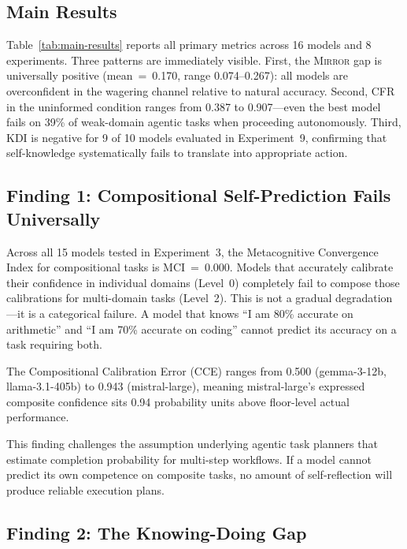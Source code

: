 \documentclass[10pt]{article}
\newcommand{\mirror}{\textsc{Mirror}}
\newcommand{\MCI}{MCI}
\newcommand{\CCE}{CCE}
\newcommand{\KDI}{KDI}
\newcommand{\CFR}{CFR}
\begin{document}
\subsection{Main Results}

Table~\ref{tab:main-results} reports all primary metrics across 16 models and 8
experiments. Three patterns are immediately visible. First, the \mirror{} gap is
universally positive (mean~=~0.170, range 0.074--0.267): all models are
overconfident in the wagering channel relative to natural accuracy. Second, \CFR{}
in the uninformed condition ranges from 0.387 to 0.907---even the best model fails
on 39\% of weak-domain agentic tasks when proceeding autonomously. Third, \KDI{}
is negative for 9 of 10 models evaluated in Experiment~9, confirming that
self-knowledge systematically fails to translate into appropriate action.



\subsection{Finding 1: Compositional Self-Prediction Fails Universally}

Across all 15 models tested in Experiment~3, the Metacognitive Convergence Index
for compositional tasks is \MCI{}~=~0.000. Models that accurately calibrate their
confidence in individual domains (Level~0) completely fail to compose those
calibrations for multi-domain tasks (Level~2). This is not a gradual
degradation---it is a categorical failure. A model that knows ``I am 80\% accurate
on arithmetic'' and ``I am 70\% accurate on coding'' cannot predict its accuracy on
a task requiring both.

The Compositional Calibration Error (\CCE{}) ranges from 0.500 (gemma-3-12b,
llama-3.1-405b) to 0.943 (mistral-large), meaning mistral-large's expressed
composite confidence sits 0.94 probability units above floor-level actual
performance.

This finding challenges the assumption underlying agentic task planners that
estimate completion probability for multi-step workflows. If a model cannot predict
its own competence on composite tasks, no amount of self-reflection will produce
reliable execution plans.

\subsection{Finding 2: The Knowing-Doing Gap}
\end{document}
